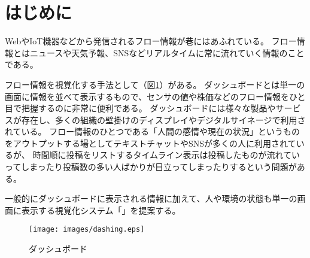 \section{はじめに}

WebやIoT機器などから発信されるフロー情報が巷にはあふれている。
フロー情報とはニュースや天気予報、SNSなどリアルタイムに常に流れていく情報のことである。

フロー情報を視覚化する手法として（図\ref{dashing}）がある。
ダッシュボードとは単一の画面に情報を並べて表示するもの\cite{few2005}で、センサの値や株価などのフロー情報をひと目で把握するのに非常に便利である。
ダッシュボードには様々な製品やサービスが存在し、多くの組織の壁掛けのディスプレイやデジタルサイネージで利用されている。
フロー情報のひとつである「人間の感情や現在の状況」というものをアウトプットする場としてテキストチャットやSNSが多くの人に利用されているが、
時間順に投稿をリストするタイムライン表示は投稿したものが流れていってしまったり投稿数の多い人ばかりが目立ってしまったりするという問題がある。

一般的にダッシュボードに表示される情報に加えて、人や環境の状態も単一の画面に表示する視覚化システム「」を提案する。

\begin{figure}[h]
\centering
\texttt{[image: images/dashing.eps]}
\caption{ダッシュボード}
\label{dashing}
\end{figure}